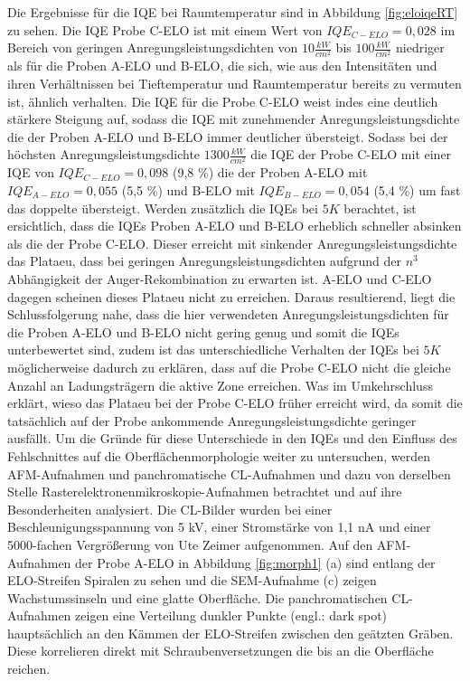 \noindent 
Die Ergebnisse für die IQE bei Raumtemperatur sind in Abbildung \ref{fig:eloiqeRT} zu sehen. Die IQE Probe C-ELO ist mit einem Wert von $IQE_{C-ELO} = 0,028$ im Bereich von geringen Anregungsleistungsdichten von $ 10 \frac{kW}{cm^2} $ bis $ 100 \frac{kW}{cm^2} $ niedriger als für die Proben A-ELO und B-ELO, die sich, wie aus den Intensitäten und ihren Verhältnissen bei Tieftemperatur und Raumtemperatur bereits zu vermuten ist, ähnlich verhalten. 
\newline
Die IQE für die Probe C-ELO weist indes eine deutlich stärkere Steigung auf, sodass die IQE mit zunehmender Anregungsleistungsdichte die der Proben A-ELO und B-ELO immer deutlicher übersteigt. Sodass bei der höchsten Anregungsleistungsdichte $ 1300 \frac{kW}{cm^2} $ die IQE der Probe C-ELO mit einer IQE von $IQE_{C-ELO} = 0,098$ (9,8 \%) die der Proben A-ELO mit $IQE_{A-ELO} = 0,055$ (5,5 \%) und B-ELO mit $IQE_{B-ELO} = 0,054$ (5,4 \%) um fast das doppelte übersteigt. Werden zusätzlich die IQEs bei $5K$ berachtet, ist ersichtlich, dass die IQEs Proben A-ELO und B-ELO erheblich schneller absinken als die der Probe C-ELO. Dieser erreicht mit sinkender Anregungsleistungsdichte das Plataeu, dass bei geringen Anregungsleistungsdichten aufgrund der $n^3$ Abhängigkeit der Auger-Rekombination zu erwarten ist.
\newline
A-ELO und C-ELO dagegen scheinen dieses Plataeu nicht zu erreichen. Daraus resultierend, liegt die Schlussfolgerung nahe, dass die hier verwendeten Anregungsleistungsdichten für die Proben A-ELO und B-ELO nicht gering genug und somit die IQEs unterbewertet sind, zudem ist das unterschiedliche Verhalten der IQEs bei $5K$ möglicherweise dadurch zu erklären, dass auf die Probe C-ELO nicht die gleiche Anzahl an Ladungsträgern die aktive Zone erreichen. Was im Umkehrschluss erklärt, wieso das Plataeu bei der Probe C-ELO früher erreicht wird, da somit die tatsächlich auf der Probe ankommende Anregungsleistungsdichte geringer ausfällt.  
\newline
Um die Gründe für diese Unterschiede in den IQEs und den Einfluss des Fehlschnittes auf die Oberflächenmorphologie weiter zu untersuchen, werden AFM-Aufnahmen und panchromatische CL-Aufnahmen und dazu von derselben Stelle Rasterelektronenmikroskopie-Aufnahmen betrachtet und auf ihre Besonderheiten analysiert. Die CL-Bilder wurden bei einer Beschleunigungsspannung von 5 kV,
einer Stromstärke von 1,1 nA und einer 5000-fachen Vergrößerung von Ute Zeimer aufgenommen.
\newline
Auf den AFM-Aufnahmen der Probe A-ELO in Abbildung \ref{fig:morph1} (a) sind entlang der ELO-Streifen Spiralen zu sehen und die SEM-Aufnahme (c) zeigen Wachstumssinseln und eine glatte Oberfläche. Die panchromatischen CL-Aufnahmen zeigen eine Verteilung dunkler Punkte (engl.: dark spot) hauptsächlich an den Kämmen der ELO-Streifen zwischen den geätzten Gräben. Diese korrelieren direkt mit Schraubenversetzungen die bis an die Oberfläche reichen. 
